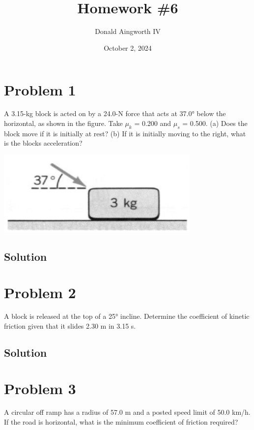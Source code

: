 \documentclass[12pt]{article}
\title{Homework \#6}
\author{Donald Aingworth IV}
\date{October 2, 2024}
\begin{document}

\maketitle

\section*{Problem 1}
A 3.15-kg block is acted on by a 24.0-N force that acts at 37.0\unit{\degree} below the horizontal, as shown in the figure. Take $\mu_k$ = 0.200 and $\mu_s$ = 0.500. (a) Does the block move if it is initially at rest? (b) If it is initially moving to the right, what is the blocks acceleration?

\begin{center}
    \includegraphics*[width=10cm]{graph_1.png}
\end{center}

\subsection*{Solution}

\pagebreak
\section*{Problem 2}
A block is released at the top of a 25\unit{\degree} incline. Determine the coefficient of kinetic friction given that it slides 2.30 m in 3.15 s.

\subsection*{Solution}


\pagebreak
\section*{Problem 3}
A circular off ramp has a radius of 57.0 m and a posted speed limit of 50.0 km/h. If the road is horizontal, what is the minimum coefficient of friction required?
\end{document}
